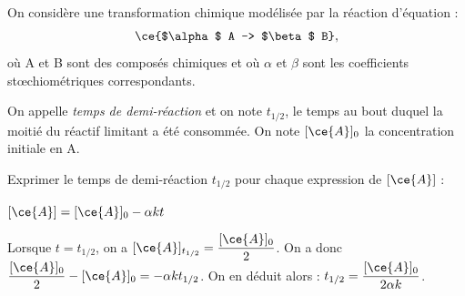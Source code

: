 \newpage



\hauteurLargeurCadreReponse		{10mm}{5cm}
\initialisationEntrainement

On considère une transformation chimique modélisée par la réaction d'équation :
\[
\ce{$\alpha$ A -> $\beta$ B},
\]
où A et B sont des composés chimiques et où $\alpha$ et $\beta$ sont les coefficients stœchiométriques correspondants.
 
On appelle \emph{temps de demi-réaction} et on note $t_{1/2}$, le temps au bout duquel la moitié du réactif limitant a été consommée. On note $[\ce{A}]_0$ la concentration initiale en A. 

\medskip

Exprimer le temps de demi-réaction $t_{1/2}$ pour chaque expression de $[\ce{A}]$ : 

\debutEntrainement

	

\begin{enonce}
$[\ce{A}] = [\ce{A}]_0 - \alpha   k  t$
\end{enonce}


\begin{corrige}
Lorsque $t = t_{1/2}$, on a $[\ce{A}]_{t_{1/2}} = \dfrac{[\ce{A}]_0}{2}$. On a donc $\dfrac{[\ce{A}]_0}{2} - [\ce{A}]_0 = -\alpha kt_{1/2}$. On en déduit alors : $t_{1/2} = \dfrac{[\ce{A}]_0}{2\alpha k}$.
\end{corrige}


